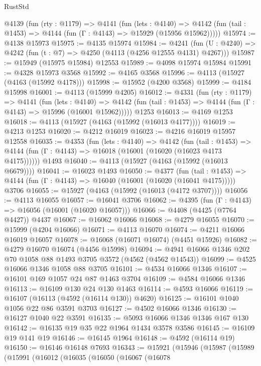 \begin{lexlean}{RustStd}
\begin{coremodule}
  @4139
    (fun (rty : @1179) =>
    @4141
      (fun (lets : @4140) =>
      @4142 (fun (tail : @1453) => @4144 (fun (Γ : @4143) => @15929 (@15956 @15962)))))
@15974 := @4138 @15973
@15975 := @4135 @15974
@15984 := @4241
    (fun (U : @4240) => @4242 (fun (t : @7) => @4250 (@4113 (@4256 @12555 @4131) @4267)))
@15987 := @15949 (@15975 @15984) @12553
@15989 := @4098 @15974 @15984
@15991 := @4328 @15973 @3568
@15992 := @4165 @3568
@15996 := @4113 (@15927 (@4163 (@15992 @4178)))
@15998 := @15952 (@4200 @3568)
@15999 := @4184 @15998
@16001 := @4113 (@15999 @4205)
@16012 := @4331
    (fun (rty : @1179) =>
    @4141
      (fun (lets : @4140) =>
      @4142 (fun (tail : @1453) => @4144 (fun (Γ : @4143) => @15996 (@16001 @15962)))))
    @1253
@16013 := @4169 @1253
@16018 := @4113 (@15927 (@4163 (@15992 (@16013 @4177))))
@16019 := @4213 @1253
@16020 := @4212 @16019
@16023 := @4216 @16019 @15957 @12558
@16035 := @4353
    (fun (lets : @4140) =>
    @4142
      (fun (tail : @1453) =>
      @4144 (fun (Γ : @4143) => @16018 (@16001 (@16020 (@16023 @4173 @4175))))))
    @1493
@16040 := @4113 (@15927 (@4163 (@15992 (@16013 @6679))))
@16041 := @16023 @1493
@16050 := @4377
    (fun (tail : @1453) => @4144 (fun (Γ : @4143) => @16040 (@16001 (@16020 (@16041 @4175)))))
    @3706
@16055 := @15927 (@4163 (@15992 (@16013 (@4172 @3707))))
@16056 := @4113 @16055
@16057 := @16041 @3706
@16062 := @4395 (fun (Γ : @4143) => @16056 (@16001 (@16020 @16057)))
@16066 := @4408 (@4425 (@7764 @4427)) @4437
@16067 := @16062 @16066
@16068 := @4279 @16055
@16070 := @15999 (@4204 @16066)
@16071 := @4113 @16070
@16074 := @4211 @16066 @16019 @16057
@16078 := @16068 (@16071 @16074) (@4451 @15926)
@16082 := @4279 @16070 @16074 (@4456 @15998)
@16094 := @4941 @16066 @1346 @202 @70 @1058 @88 @1493 @3705 @3572 (@4562 (@4562 @14543))
@16099 := @4525 @16066 @1346 @1058 @88 @3705
@16101 := @4534 @16066 @1346
@16107 := @16101 @169 @1057 @24 @87 @1463 @3704
@16109 := @4584 @16066 @1346
@16113 := @16109 @130 @24 @130 @1463
@16114 := @4593 @16066
@16119 := @16107 (@16113 (@4592 (@16114 @130)) @4620)
@16125 := @16101 @1040 @1056 @22 @86 @3591 @3703
@16127 := @4502 @16066 @1346
@16130 := @16127 @1040 @22 @3591
@16135 := @5093 @16066 @1346 @1346 @167 @130
@16142 := @16135 @19 @35 @22 @1964 @1434 @3578 @3586
@16145 := @16109 @19 @141 @19
@16146 := @16145 @1964
@16148 := @4592 (@16114 @19)
@16150 := @16146 @16148 @7693
@16343 := @15921
    (@15946
      (@15987
        (@15989
          (@15991
            (@16012
              (@16035
                (@16050
                  (@16067
                    (@16078

\end{coremodule}
\end{lexlean}
